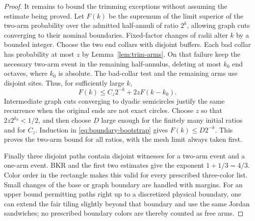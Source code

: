 \begin{proof}
It remains to bound the trimming exceptions without assuming
the estimate being proved.  Let $F(k)$ be the supremum of the
limit superior of the two-arm probability over the admitted
half-annuli of ratio $2^k$, allowing graph cuts converging to
their nominal boundaries.  Fixed-factor changes of radii
alter $k$ by a bounded integer.  Choose the two end collars
with disjoint buffers.  Each bad collar has probability at
most $z$ by Lemma~\ref{lem:trim-arms}.  On that failure keep
the necessary two-arm event in the remaining half-annulus,
deleting at most $k_0$ end octaves, where $k_0$ is absolute.
The bad-collar test and the remaining arms use disjoint sites.
Thus, for sufficiently large $k$,
\begin{equation}\label{eq:boundary-bootstrap}
 F(k)\le C_z2^{-k}+2z F(k-k_0).
\end{equation}
Intermediate graph cuts converging to dyadic semicircles
justify the same recurrence when the original ends are not
exact circles.  Choose $z$ so that $2z2^{k_0}<1/2$, and then
choose $D$ large enough for the finitely many initial ratios
and for $C_z$.  Induction in \eqref{eq:boundary-bootstrap}
gives $F(k)\le D2^{-k}$.  This proves the two-arm bound for
all ratios, with the mesh limit always taken first.

Finally three disjoint paths contain disjoint witnesses for
a two-arm event and a one-arm event.  BKR and the first two
estimates give the exponent $1+1/3=4/3$.  Color order in the
rectangle makes this valid for every prescribed three-color
list.  Small changes of the base or graph boundary are
handled with margins.  For an upper bound permitting paths
right up to a discretized physical boundary, one can extend
the fair tiling slightly beyond that boundary and use the
same Jordan sandwiches; no prescribed boundary colors are
thereby counted as free arms.
\end{proof}

